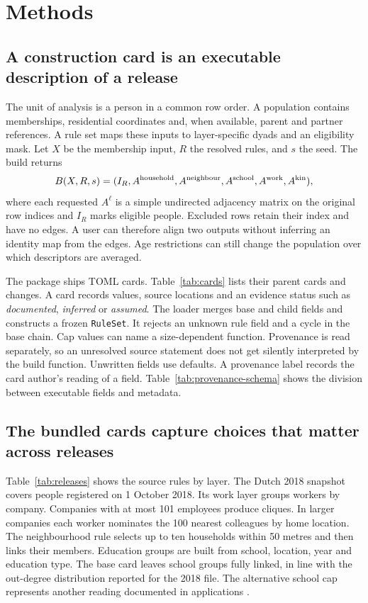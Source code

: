 \section{Methods}\label{sec:methods}

\subsection{A construction card is an executable description of a release}

The unit of analysis is a person in a common row order. A population contains memberships, residential coordinates and, when available, parent and partner references. A rule set maps these inputs to layer-specific dyads and an eligibility mask. Let $X$ be the membership input, $R$ the resolved rules, and $s$ the seed. The build returns
\[
    B(X,R,s) = (I_R, A^{\rm household}, A^{\rm neighbour},
                      A^{\rm school}, A^{\rm work}, A^{\rm kin}),
\]
where each requested $A^\ell$ is a simple undirected adjacency matrix on the original row indices and $I_R$ marks eligible people. Excluded rows retain their index and have no edges. A user can therefore align two outputs without inferring an identity map from the edges. Age restrictions can still change the population over which descriptors are averaged.

The package ships \CardCount{} TOML cards. Table~\ref{tab:cards} lists their parent cards and changes. A card records values, source locations and an evidence status such as \emph{documented}, \emph{inferred} or \emph{assumed}. The loader merges base and child fields and constructs a frozen \texttt{RuleSet}. It rejects an unknown rule field and a cycle in the base chain. Cap values can name a size-dependent function. Provenance is read separately, so an unresolved source statement does not get silently interpreted by the build function. Unwritten fields use defaults. A provenance label records the card author's reading of a field. Table~\ref{tab:provenance-schema} shows the division between executable fields and metadata.



\subsection{The bundled cards capture choices that matter across releases}

Table~\ref{tab:releases} shows the source rules by layer. The Dutch 2018 snapshot covers people registered on 1 October 2018. Its work layer groups workers by company. Companies with at most 101 employees produce cliques. In larger companies each worker nominates the 100 nearest colleagues by home location. The neighbourhood rule selects up to ten households within 50 metres and then links their members. Education groups are built from school, location, year and education type. The base card leaves school groups fully linked, in line with the out-degree distribution reported for the 2018 file. The alternative school cap represents another reading documented in applications \citep{vanderlaan2022,vanderlaan2023,bos2022}.



